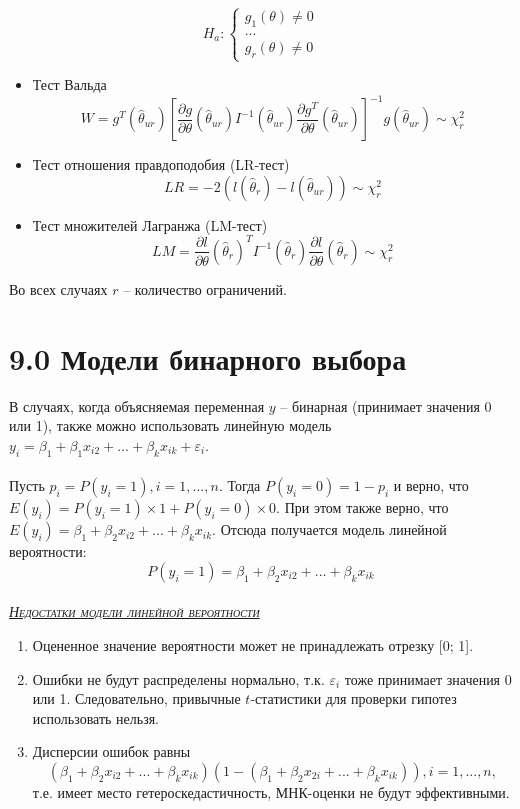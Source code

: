 \documentclass[a0,final]{a0poster}
\begin{document}
\begin{multicols}{4}
\begin{multicols}{2}
  \begin{equation*}
       H_a:
\begin{cases}
    g_1(\theta) \ne 0 \\
    ... \\
    g_r(\theta) \ne 0
\end{cases}
  \end{equation*}
\end{multicols}
\setlength{\columnseprule}{1pt}
\begin{itemize}
\item Тест Вальда
$$W = g^T(\hat{\theta}_{ur})[\frac{\partial g}{\partial \theta}(\hat{\theta}_{ur})I^{-1}(\hat{\theta}_{ur})\frac{\partial g^T}{\partial \theta}(\hat{\theta}_{ur})]^{-1}g(\hat{\theta}_{ur}) \sim \chi^2_r$$
\item Тест отношения правдоподобия (LR-тест)
$$LR = -2(l(\hat{\theta}_{r})-l(\hat{\theta}_{ur})) \sim \chi^2_r$$
\item Тест множителей Лагранжа (LM-тест)
$$LM = \frac{\partial l}{\partial \theta}(\hat{\theta}_{r})^T I^{-1}(\hat{\theta}_r)\frac{\partial l}{\partial \theta}(\hat{\theta}_r) \sim \chi^2_r$$
\end{itemize}

Во всех случаях $r$ -- количество ограничений.

\section*{9.0 Модели бинарного выбора}
В случаях, когда объясняемая переменная $y$ -- бинарная (принимает значения 0 или 1), также можно использовать линейную модель \\
$y_i = \beta_1 + \beta_1x_{i2} + ... + \beta_kx_{ik} + \varepsilon_i$.\\
\\
Пусть $p_i = P(y_i = 1), i = 1, ..., n$. Тогда $P(y_i = 0) = 1 - p_i$ и верно, что $E(y_i) = P(y_i = 1)\times 1 + P(y_i = 0)\times 0$. При этом также верно, что $E(y_i) = \beta_1 + \beta_2x_{i2} + ... + \beta_kx_{ik}$. Отсюда получается модель линейной вероятности:
$$P(y_i = 1) = \beta_1 + \beta_2x_{i2} + ... + \beta_kx_{ik}$$
\\
\underline{\textsc{\textit{Недостатки модели линейной вероятности}}}
\begin{enumerate}
\item Оцененное значение вероятности может не принадлежать отрезку [0; 1].
\item Ошибки не будут распределены нормально, т.к. $\varepsilon_i$ тоже принимает значения 0 или 1. Следовательно, привычные $t$-статистики для проверки гипотез использовать нельзя.
\item Дисперсии ошибок равны $$(\beta_1 + \beta_2x_{i2} + ... + \beta_kx_{ik})(1 - (\beta_1 + \beta_2x_{2i} + ... + \beta_kx_{ik})), i = 1, ..., n,$$
т.е. имеет место гетероскедастичность, МНК-оценки не будут эффективными.
\end{enumerate}

\end{multicols}
\end{document}
